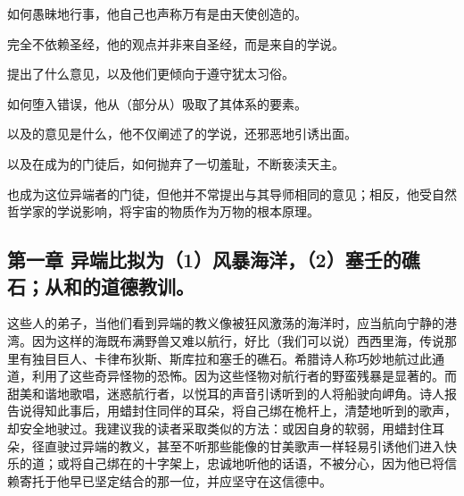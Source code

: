 如何愚昧地行事，他自己也声称万有是由天使创造的。\par

完全不依赖圣经，他的观点并非来自圣经，而是来自的学说。\par

提出了什么意见，以及他们更倾向于遵守犹太习俗。\par

如何堕入错误，他从（部分从）吸取了其体系的要素。\par

以及的意见是什么，他不仅阐述了的学说，还邪恶地引诱出面。\par

以及在成为的门徒后，如何抛弃了一切羞耻，不断亵渎天主。\par

也成为这位异端者的门徒，但他并不常提出与其导师相同的意见；相反，他受自然哲学家的学说影响，将宇宙的物质作为万物的根本原理。\par


\subsection{第一章 异端比拟为（1）风暴海洋，（2）塞壬的礁石；从和的道德教训。}

这些人的弟子，当他们看到异端的教义像被狂风激荡的海洋时，应当航向宁静的港湾。因为这样的海既布满野兽又难以航行，好比（我们可以说）西西里海，传说那里有独目巨人、卡律布狄斯、斯库拉和塞壬的礁石。希腊诗人称巧妙地航过此通道，利用了这些奇异怪物的恐怖。因为这些怪物对航行者的野蛮残暴是显著的。而甜美和谐地歌唱，迷惑航行者，以悦耳的声音引诱听到的人将船驶向岬角。诗人报告说得知此事后，用蜡封住同伴的耳朵，将自己绑在桅杆上，清楚地听到的歌声，却安全地驶过。我建议我的读者采取类似的方法：或因自身的软弱，用蜡封住耳朵，径直驶过异端的教义，甚至不听那些能像的甘美歌声一样轻易引诱他们进入快乐的道；或将自己绑在的十字架上，忠诚地听他的话语，不被分心，因为他已将信赖寄托于他早已坚定结合的那一位，并应坚守在这信德中。\par

